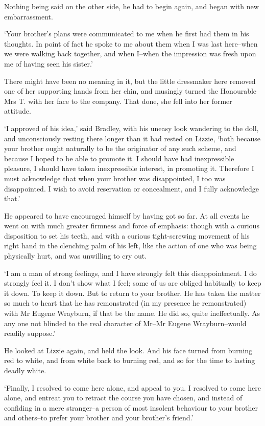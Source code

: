 Nothing being said on the other side, he had to begin again, and began
with new embarrassment.

‘Your brother’s plans were communicated to me when he first had them in
his thoughts. In point of fact he spoke to me about them when I was
last here--when we were walking back together, and when I--when the
impression was fresh upon me of having seen his sister.’

There might have been no meaning in it, but the little dressmaker here
removed one of her supporting hands from her chin, and musingly turned
the Honourable Mrs T. with her face to the company. That done, she fell
into her former attitude.

‘I approved of his idea,’ said Bradley, with his uneasy look wandering
to the doll, and unconsciously resting there longer than it had
rested on Lizzie, ‘both because your brother ought naturally to be the
originator of any such scheme, and because I hoped to be able to promote
it. I should have had inexpressible pleasure, I should have taken
inexpressible interest, in promoting it. Therefore I must acknowledge
that when your brother was disappointed, I too was disappointed. I wish
to avoid reservation or concealment, and I fully acknowledge that.’

He appeared to have encouraged himself by having got so far. At all
events he went on with much greater firmness and force of emphasis:
though with a curious disposition to set his teeth, and with a curious
tight-screwing movement of his right hand in the clenching palm of his
left, like the action of one who was being physically hurt, and was
unwilling to cry out.

‘I am a man of strong feelings, and I have strongly felt this
disappointment. I do strongly feel it. I don’t show what I feel; some
of us are obliged habitually to keep it down. To keep it down. But to
return to your brother. He has taken the matter so much to heart that
he has remonstrated (in my presence he remonstrated) with Mr Eugene
Wrayburn, if that be the name. He did so, quite ineffectually. As any
one not blinded to the real character of Mr--Mr Eugene Wrayburn--would
readily suppose.’

He looked at Lizzie again, and held the look. And his face turned from
burning red to white, and from white back to burning red, and so for the
time to lasting deadly white.

‘Finally, I resolved to come here alone, and appeal to you. I resolved
to come here alone, and entreat you to retract the course you have
chosen, and instead of confiding in a mere stranger--a person of most
insolent behaviour to your brother and others--to prefer your brother
and your brother’s friend.’


